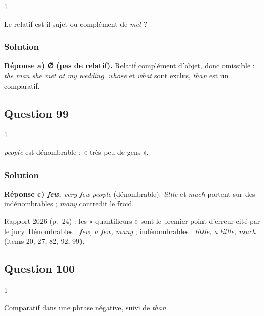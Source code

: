 \documentclass[11pt,a4paper]{article}
\begin{document}
\begin{indication}{1}

Le relatif est-il sujet ou complément de \emph{met} ?

\end{indication}

\hypertarget{solution-97}{%
\subsubsection{Solution}\label{solution-97}}

\textbf{Réponse a) ∅ (pas de relatif).} Relatif complément d'objet, donc omissible : \emph{the man she met at my wedding}. \emph{whose} et \emph{what} sont exclus, \emph{than} est un comparatif.

\hypertarget{question-99}{%
\subsection{Question 99}\label{question-99}}

\begin{indication}{1}

\emph{people} est dénombrable ; « très peu de gens ».

\end{indication}

\hypertarget{solution-98}{%
\subsubsection{Solution}\label{solution-98}}

\textbf{Réponse c) \emph{few}.} \emph{very few people} (dénombrable). \emph{little} et \emph{much} portent sur des indénombrables ; \emph{many} contredit le froid.

\begin{jury}

Rapport 2026 (p.~24) : les « quantifieurs » sont le premier point d'erreur cité par le jury. Dénombrables : \emph{few, a few, many} ; indénombrables : \emph{little, a little, much} (items 20, 27, 82, 92, 99).

\end{jury}

\hypertarget{question-100}{%
\subsection{Question 100}\label{question-100}}

\begin{indication}{1}

Comparatif dans une phrase négative, suivi de \emph{than}.

\end{indication}
\end{document}
